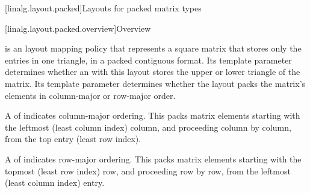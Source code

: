 [linalg.layout.packed]{Layouts for packed matrix types}

[linalg.layout.packed.overview]{Overview}

\pnum
{} is an  layout mapping policy
that represents a square matrix that stores only the entries in one
triangle, in a packed contiguous format.
Its  template parameter determines
whether an  with this layout
stores the upper or lower triangle of the matrix.
Its  template parameter determines
whether the layout packs the matrix's elements
in column-major or row-major order.

\pnum
A  of 
indicates column-major ordering.
This packs matrix elements
starting with the leftmost (least column index) column, and
proceeding column by column, from the top entry (least row index).

\pnum
A  of 
indicates row-major ordering.
This packs matrix elements
starting with the topmost (least row index) row, and
proceeding row by row, from the leftmost (least column index) entry.

